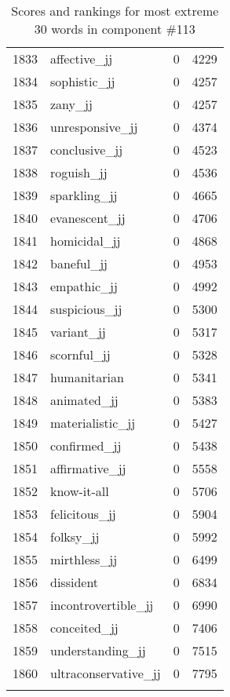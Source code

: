 \begin{longtable}[!htbp]{| rlr@{.}l |}
    1833 & affective\_jj & 0 & 4229 \\
    1834 & sophistic\_jj & 0 & 4257 \\
    1835 & zany\_jj & 0 & 4257 \\
    1836 & unresponsive\_jj & 0 & 4374 \\
    1837 & conclusive\_jj & 0 & 4523 \\
    1838 & roguish\_jj & 0 & 4536 \\
    1839 & sparkling\_jj & 0 & 4665 \\
    1840 & evanescent\_jj & 0 & 4706 \\
    1841 & homicidal\_jj & 0 & 4868 \\
    1842 & baneful\_jj & 0 & 4953 \\
    1843 & empathic\_jj & 0 & 4992 \\
    1844 & suspicious\_jj & 0 & 5300 \\
    1845 & variant\_jj & 0 & 5317 \\
    1846 & scornful\_jj & 0 & 5328 \\
    1847 & humanitarian & 0 & 5341 \\
    1848 & animated\_jj & 0 & 5383 \\
    1849 & materialistic\_jj & 0 & 5427 \\
    1850 & confirmed\_jj & 0 & 5438 \\
    1851 & affirmative\_jj & 0 & 5558 \\
    1852 & know-it-all & 0 & 5706 \\
    1853 & felicitous\_jj & 0 & 5904 \\
    1854 & folksy\_jj & 0 & 5992 \\
    1855 & mirthless\_jj & 0 & 6499 \\
    1856 & dissident & 0 & 6834 \\
    1857 & incontrovertible\_jj & 0 & 6990 \\
    1858 & conceited\_jj & 0 & 7406 \\
    1859 & understanding\_jj & 0 & 7515 \\
    1860 & ultraconservative\_jj & 0 & 7795 \\
    \hline
    \caption{Scores and rankings for most extreme 30 words in component \#113} \\
\end{longtable}

